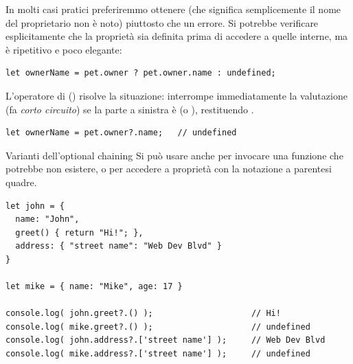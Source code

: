 In molti casi pratici preferiremmo ottenere  (che significa
semplicemente \guillemotleft il nome del proprietario non è noto\guillemotright) piuttosto che un
errore. Si potrebbe verificare esplicitamente che la proprietà sia definita
prima di accedere a quelle interne, ma è ripetitivo e poco elegante:

\begin{lstlisting}[style=js]
let ownerName = pet.owner ? pet.owner.name : undefined;
\end{lstlisting}

L'operatore di  () risolve la situazione:
interrompe immediatamente la valutazione (fa \textit{corto circuito}) se la
parte a sinistra è  (o ), restituendo
.

\begin{affianco}[0.45][c]
\begin{lstlisting}[style=js]
let ownerName = pet.owner?.name;   // undefined
\end{lstlisting}
\risultato
\begin{immagine}
\end{immagine}
\end{affianco}

\begin{esempio}{Varianti dell'optional chaining}
Si può usare anche per invocare una funzione che potrebbe non esistere, o per
accedere a proprietà con la notazione a parentesi quadre.

\begin{lstlisting}[style=js, name=chaining-varianti.js]
let john = {
  name: "John",
  greet() { return "Hi!"; },
  address: { "street name": "Web Dev Blvd" }
}

let mike = { name: "Mike", age: 17 }

console.log( john.greet?.() );                    // Hi!
console.log( mike.greet?.() );                    // undefined
console.log( john.address?.['street name'] );     // Web Dev Blvd
console.log( mike.address?.['street name'] );     // undefined
\end{lstlisting}
\end{esempio}

